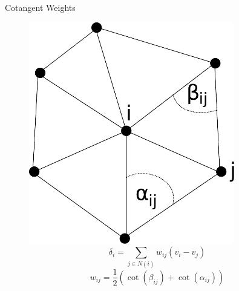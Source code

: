 \documentclass{beamer}
\begin{document}
\begin{frame}{Cotangent Weights}

\begin{figure}
\begin{minipage}{0.45\textwidth}
    \includegraphics[width=0.8\textwidth]{DiscretizedLaplacian.pdf}
    \[ \delta_i = \sum_{j \in N(i)} w_{ij}(v_i - v_j) \]
    \[ w_{ij} = \frac{1}{2}( \cot(\beta_{ij}) + \cot(\alpha_{ij}))\]
\end{minipage}
\end{figure}


\end{frame}
\end{document}
